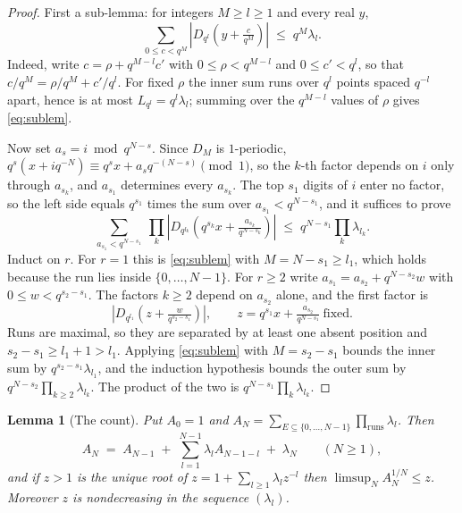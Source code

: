 \documentclass[11pt]{amsart}
\newtheorem{lemma}[theorem]{Lemma}
\theoremstyle{definition}
\theoremstyle{remark}
\begin{document}
\begin{proof}
First a sub-lemma: for integers $M \ge l \ge 1$ and every real $y$,
\begin{equation}
\label{eq:sublem}
  \sum_{0 \le c < q^{M}} \left|D_{q^{l}}\!\left(y + \tfrac{c}{q^{M}}\right)\right| \;\le\; q^{M}\lambda_{l} .
\end{equation}
Indeed, write $c = \rho + q^{M-l}c'$ with $0 \le \rho < q^{M-l}$ and $0 \le c' < q^{l}$, so that $c/q^{M} = \rho/q^{M} + c'/q^{l}$. For fixed $\rho$ the inner sum runs over $q^{l}$ points spaced $q^{-l}$ apart, hence is at most $L_{q^{l}} = q^{l}\lambda_{l}$; summing over the $q^{M-l}$ values of $\rho$ gives \cref{eq:sublem}.

Now set $a_{s} = i \bmod q^{N-s}$. Since $D_{M}$ is $1$-periodic, $q^{s}(x + iq^{-N}) \equiv q^{s}x + a_{s}q^{-(N-s)} \pmod 1$, so the $k$-th factor depends on $i$ only through $a_{s_{k}}$, and $a_{s_{1}}$ determines every $a_{s_{k}}$. The top $s_{1}$ digits of $i$ enter no factor, so the left side equals $q^{s_{1}}$ times the sum over $a_{s_{1}} < q^{N-s_{1}}$, and it suffices to prove
\[
  \sum_{a_{s_{1}} < q^{N-s_{1}}}\ \prod_{k} \left|D_{q^{l_{k}}}\!\left(q^{s_{k}}x + \tfrac{a_{s_{k}}}{q^{N-s_{k}}}\right)\right| \;\le\; q^{N-s_{1}}\prod_{k}\lambda_{l_{k}} .
\]
Induct on $r$. For $r = 1$ this is \cref{eq:sublem} with $M = N - s_{1} \ge l_{1}$, which holds because the run lies inside $\{0,\dots,N-1\}$. For $r \ge 2$ write $a_{s_{1}} = a_{s_{2}} + q^{N-s_{2}}w$ with $0 \le w < q^{s_{2}-s_{1}}$. The factors $k \ge 2$ depend on $a_{s_{2}}$ alone, and the first factor is
\[
  \left|D_{q^{l_{1}}}\!\left(z + \tfrac{w}{q^{s_{2}-s_{1}}}\right)\right|, \qquad z = q^{s_{1}}x + \tfrac{a_{s_{2}}}{q^{N-s_{1}}} \ \text{fixed}.
\]
Runs are maximal, so they are separated by at least one absent position and $s_{2} - s_{1} \ge l_{1} + 1 > l_{1}$. Applying \cref{eq:sublem} with $M = s_{2}-s_{1}$ bounds the inner sum by $q^{s_{2}-s_{1}}\lambda_{l_{1}}$, and the induction hypothesis bounds the outer sum by $q^{N-s_{2}}\prod_{k \ge 2}\lambda_{l_{k}}$. The product of the two is $q^{N-s_{1}}\prod_{k}\lambda_{l_{k}}$.
\end{proof}

\begin{lemma}[The count]
\label{lem:count}
Put $A_{0} = 1$ and $A_{N} = \sum_{E \subseteq \{0,\dots,N-1\}}\prod_{\mathrm{runs}}\lambda_{l}$. Then
\[
  A_{N} \;=\; A_{N-1} \;+\; \sum_{l=1}^{N-1}\lambda_{l}A_{N-1-l} \;+\; \lambda_{N} \qquad (N \ge 1),
\]
and if $z > 1$ is the unique root of $z = 1 + \sum_{l \ge 1}\lambda_{l}z^{-l}$ then $\limsup_{N} A_{N}^{1/N} \le z$. Moreover $z$ is nondecreasing in the sequence $(\lambda_{l})$.
\end{lemma}
\end{document}
